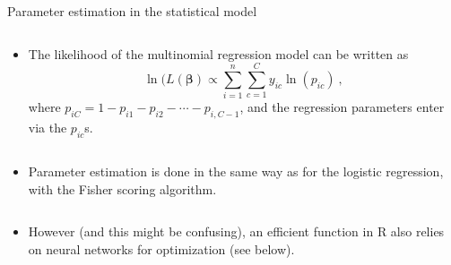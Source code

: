 \documentclass[10pt,ignorenonframetext,]{beamer}
\providecommand{\tightlist}{%
  \setlength{\itemsep}{0pt}\setlength{\parskip}{0pt}}
\begin{document}
\begin{frame}

\begin{block}{Parameter estimation in the statistical model}

\(~\)

\begin{itemize}
\tightlist
\item
  The likelihood of the multinomial regression model can be written as
  \[ \ln(L({\boldsymbol \beta})\propto \sum_{i=1}^n \sum_{c=1}^C y_{ic}\ln(p_{ic}) \ ,\]
  where \(p_{iC}=1-p_{i1}-p_{i2}-\cdots -p_{i,C-1}\), and the regression
  parameters enter via the \(p_{ic}\)s.
\end{itemize}

\(~\)

\begin{itemize}
\tightlist
\item
  Parameter estimation is done in the same way as for the logistic
  regression, with the Fisher scoring algorithm.
\end{itemize}

\(~\)

\begin{itemize}
\tightlist
\item
  However (and this might be confusing), an efficient function in R also
  relies on neural networks for optimization (see below).
\end{itemize}

\end{block}

\end{frame}
\end{document}
